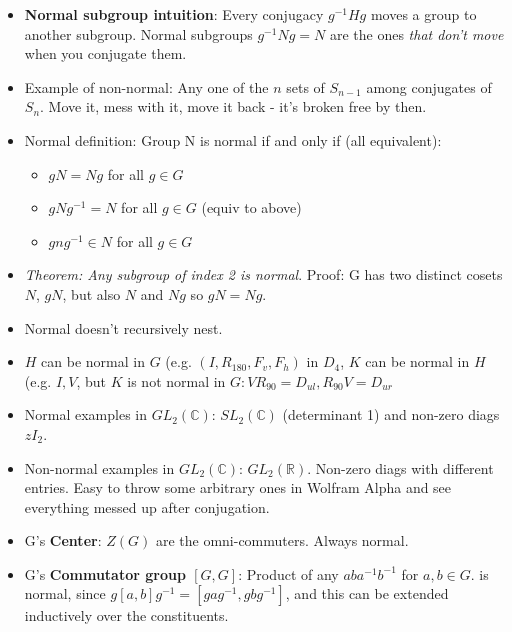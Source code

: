 \documentclass[11pt, oneside]{article}   	%
\begin{document}
\begin{itemize}
\item \textbf{Normal subgroup intuition}: Every conjugacy $g^{-1}Hg$ moves a group to another subgroup.  Normal subgroups  $g^{-1}Ng = N$ are the ones \emph{that don't move} when you conjugate them.
\item Example of non-normal: Any one of the $n$ sets of $S_{n-1}$ among conjugates of $S_n$.     Move it, mess with it, move it back - it's broken free by then.
\item Normal definition: Group N is normal if and only if (all equivalent):
	\begin{itemize}
	\item $gN = Ng$ for all $g \in G$
	\item $gNg^{-1} = N$ for all $g \in G$ (equiv to above)
	\item $gng^{-1} \in N$ for all $g \in G$
	\end{itemize}
\item \emph{Theorem: Any subgroup of index 2 is normal}.  Proof: G has two distinct cosets $N$, $gN$, but also $N$ and $Ng$ so $gN = Ng$.
\item Normal doesn't recursively nest.  \item $H$ can be normal in $G$ (e.g. $(I, R_{180}, F_v, F_h)$ in $D_4$,  $K$ can be normal in $H$ (e.g. ${I, V}$, but $K$ is not normal in $G: VR_{90} = D_{ul}, R_{90}V = D_{ur}$
\item Normal examples in $GL_2(\mathbb{C})$: $SL_2(\mathbb{C})$ (determinant 1) and non-zero diags $zI_2$.  
\item Non-normal examples in $GL_2(\mathbb{C})$: $GL_2(\mathbb{R})$.  Non-zero diags with different entries. Easy to throw some arbitrary ones in Wolfram Alpha and see everything messed up after conjugation.
\item G's \textbf{Center}: $Z(G)$ are the omni-commuters.  Always normal.
\item G's \textbf{Commutator group $[G,G]$}: Product of any $aba^{-1}b^{-1}$ for $a, b \in G$. is normal, since $g[a,b]g^{-1} = [gag^{-1}, gbg^{-1}]$, and this can be extended inductively over the constituents.
\end{itemize}
\end{document}
